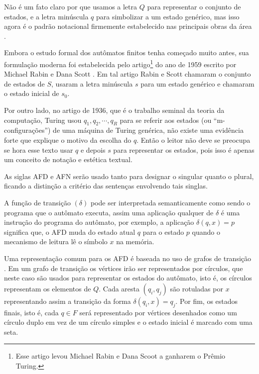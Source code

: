Não é um fato claro por que usamos a letra $Q$ para representar o conjunto de estados, e a letra minúscula $q$ para simbolizar a um estado genérico, mas isso agora é o padrão notacional firmemente estabelecido nas principais obras da área \cite{benjaLivro2010,hopcroft2008,linz2006}. 

Embora o estudo formal dos autômatos finitos tenha começado muito antes, sua formulação moderna foi estabelecida pelo artigo\footnote{Esse artigo levou Michael Rabin e Dana Scoot a ganharem o Prêmio Turing.} do ano de 1959 escrito por Michael Rabin e Dana Scott \cite{rabin1959}. Em tal artigo Rabin e Scott chamaram o conjunto de estados de $S$, usaram a letra minúscula $s$ para um estado genérico e chamaram o estado inicial de $s_0$. 

Por outro lado, no artigo de 1936, que é o trabalho seminal da teoria da computação, Turing usou $q_1, q_2, \cdots, q_R$ para se referir aos estados (ou ``m-configurações'') de uma máquina de Turing genérica, não existe uma evidência forte que explique o motivo da escolha do $q$. Então o leitor não deve se preocupa se hora esse texto usar $q$ e depois $s$ para representar os estados, pois isso é apenas um conceito de notação e estética textual.

\begin{atencao}
  As siglas AFD e AFN serão usado tanto para designar o singular quanto o plural, ficando a distinção a critério das sentenças envolvendo tais singlas.
\end{atencao}

A função de transição $(\delta)$ pode ser interpretada semanticamente como sendo o programa que o autômato executa, assim uma aplicação qualquer de $\delta$ é uma instrução do programa do autômato, por exemplo, a aplicação $\delta(q, x) = p$ significa que, o AFD muda do estado atual $q$ para o estado $p$ quando o mecanismo de leitura lê o símbolo $x$ na memória. 

Uma representação comum para os AFD é baseada no uso de grafos de transição \cite{valdi2020phd}. Em um grafo de transição os vértices irão ser representados por círculos, que neste caso são usados para representar os estados do autômato, isto é, os círculos representam os elementos de $Q$. Cada aresta $(q_i, q_j)$ são rotuladas por $x$ representando assim a transição da forma $\delta(q_i, x) = q_j$. Por fim, os estados finais, isto é, cada $q \in F$ será representado por vértices desenhados como um círculo duplo em vez de um círculo simples e o estado inicial é marcado com uma seta.

